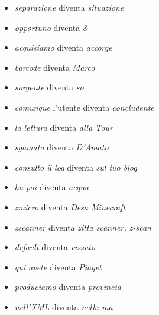 \begin{itemize}
    \item \textit{separazione} diventa \textit{situazione}
    \item \textit{opportuno} diventa \textit{8}
    \item \textit{acquisiamo} diventa \textit{accorge}
    \item \textit{barcode} diventa \textit{Marco}
    \item \textit{sorgente} diventa \textit{so}
    \item \textit{comunque} l’utente diventa \textit{concludente}
    \item \textit{la lettura} diventa \textit{alla Tour}
    \item \textit{sgamato}  diventa \textit{D'Amato}
    \item \textit{consulto il log} diventa \textit{sul tuo blog}
    \item \textit{ha poi} diventa \textit{acqua}
    \item \textit{zmicro} diventa \textit{Desa Minecraft}
    \item \textit{zscanner} diventa \textit{zitta scanner, z-scan}    
    \item \textit{default} diventa \textit{vissuto}
    \item \textit{qui avete} diventa \textit{Piaget}
    \item \textit{produciamo} diventa \textit{provincia}
    \item \textit{nell’XML} diventa \textit{nella ma}
\end{itemize}



